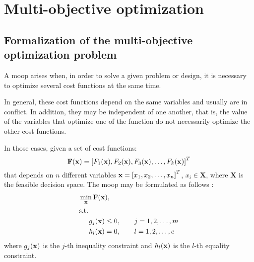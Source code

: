 \chapter{Multi-objective optimization}
\label{sec:Metodolgia}


\section{Formalization of the multi-objective optimization problem}
\label{sec:MOOPForm}
%
A \gls{moop} arises when, in order to solve a given problem or design, it is necessary to optimize several cost functions at the same time. 

In general, these cost functions depend on the same variables and usually are in conflict.  In addition, they may be independent of one another, that is, the value of the variables that optimize one of the function do not necessarily optimize the other cost functions.

In those cases, given a set of cost functions:
\begin{equation}
\mathbf{F}(\mathbf{x})=\left[F_1(\mathbf{x}), F_2(\mathbf{x}), F_3(\mathbf{x}), \ldots, F_k(\mathbf{x})\right]^T
\label{eq:functions}
\end{equation}
%
that depends on $n$ different variables $\mathbf{x}=\left[x_1, x_2, \ldots, x_n \right]^T$, $x_i \in \mathbf{X}$, where $\mathbf{X}$ is the feasible decision space. The \gls{moop} may be formulated as follows \citep{Marler2004}:%
%
\begin{subequations}%
	\begin{align}%
	&\min_\xv \mathbf{F}(\xv), \label{eq:Min01}\\ %
	&\text{s.t.}\nonumber\\%
	& \hspace{5mm} g_j(\xv) \leq 0, \qquad j=1,2,\ldots,m  \label{eq:Min02}\\ %
	& \hspace{5mm} h_l(\xv) = 0, \qquad l=1,2,\ldots,e  \label{eq:Min03}%
	\end{align}%
	\label{eq:OptProb}%
\end{subequations}%
%
where $g_j(\mathbf{x})$ is the $j$-th inequality constraint and $h_l(\mathbf{x})$ is the $l$-th equality constraint. 
%
